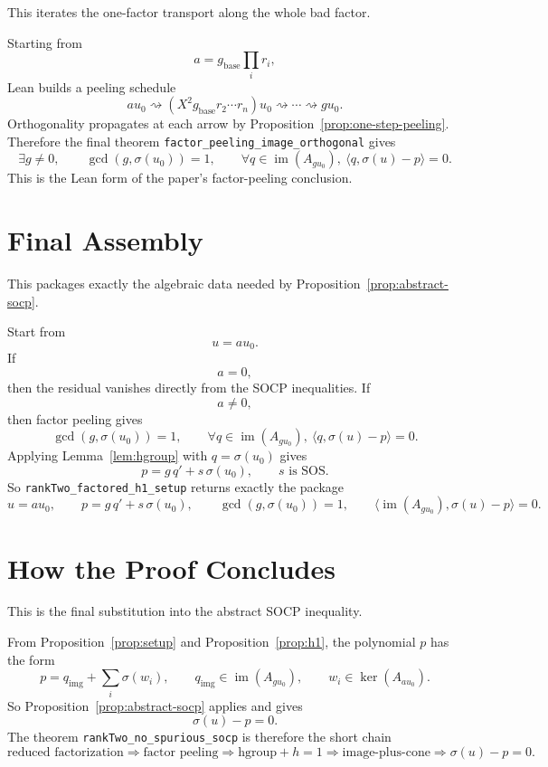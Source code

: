 This iterates the one-factor transport along the whole bad factor.
\begin{proposition}\label{prop:peeling}
\leanok
Starting from
\[
a = g_{\mathrm{base}} \prod_i r_i,
\]
Lean builds a peeling schedule
\[
a u_0
\rightsquigarrow
(X^2 g_{\mathrm{base}} r_2 \cdots r_n)u_0
\rightsquigarrow \cdots \rightsquigarrow
g u_0.
\]
Orthogonality propagates at each arrow by Proposition~\ref{prop:one-step-peeling}.
Therefore the final theorem \texttt{factor\_peeling\_image\_orthogonal} gives
\[
\exists g\neq 0,\qquad
\gcd(g,\sigma(u_0))=1,
\qquad
\forall q\in \operatorname{im}(A_{g u_0}),\ \langle q,\sigma(u)-p\rangle = 0.
\]
This is the Lean form of the paper's factor-peeling conclusion.
\end{proposition}

\section{Final Assembly}

This packages exactly the algebraic data needed by Proposition~\ref{prop:abstract-socp}.
\begin{proposition}\label{prop:setup}
\leanok
Start from
\[
u=a u_0.
\]
If
\[
a=0,
\]
then the residual vanishes directly from the SOCP inequalities. If
\[
a\neq 0,
\]
then factor peeling gives
\[
\gcd(g,\sigma(u_0))=1,
\qquad
\forall q\in \operatorname{im}(A_{g u_0}),\ \langle q,\sigma(u)-p\rangle = 0.
\]
Applying Lemma~\ref{lem:hgroup} with $q=\sigma(u_0)$ gives
\[
p = g\,q' + s\,\sigma(u_0),
\qquad
s \text{ is SOS}.
\]
So \texttt{rankTwo\_factored\_h1\_setup} returns exactly the package
\[
u=a u_0,\qquad
p = g\,q' + s\,\sigma(u_0),\qquad
\gcd(g,\sigma(u_0))=1,
\qquad
\langle \operatorname{im}(A_{g u_0}),\sigma(u)-p\rangle = 0.
\]
\end{proposition}

\section{How the Proof Concludes}

This is the final substitution into the abstract SOCP inequality.

From Proposition~\ref{prop:setup} and Proposition~\ref{prop:h1}, the polynomial
$p$ has the form
\[
p = q_{\mathrm{img}} + \sum_i \sigma(w_i),
\qquad
q_{\mathrm{img}} \in \operatorname{im}(A_{g u_0}),
\qquad
w_i \in \ker(A_{a u_0}).
\]
So Proposition~\ref{prop:abstract-socp} applies and gives
\[
\sigma(u)-p=0.
\]
The theorem \texttt{rankTwo\_no\_spurious\_socp} is therefore the short chain
\[
\text{reduced factorization}
\Longrightarrow
\text{factor peeling}
\Longrightarrow
\text{hgroup} + h=1
\Longrightarrow
\text{image-plus-cone}
\Longrightarrow
\sigma(u)-p=0.
\]
